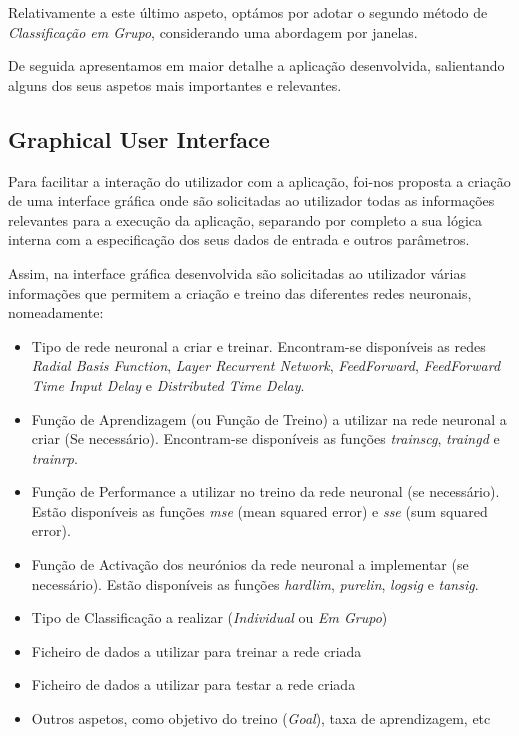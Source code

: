 \documentclass{article}
\begin{document}
Relativamente a este último aspeto, optámos por adotar o segundo método de \emph{Classificação em Grupo}, considerando uma abordagem por janelas.

De seguida apresentamos em maior detalhe a aplicação desenvolvida, salientando alguns dos seus aspetos mais importantes e relevantes.

\subsection{Graphical User Interface}

Para facilitar a interação do utilizador com a aplicação, foi-nos proposta a criação de uma interface gráfica onde são solicitadas ao utilizador todas as informações relevantes para a execução da aplicação, separando por completo a sua lógica interna com a especificação dos seus dados de entrada e outros parâmetros.

Assim, na interface gráfica desenvolvida são solicitadas ao utilizador várias informações que permitem a criação e treino das diferentes redes neuronais, nomeadamente:

\begin{itemize}
\item Tipo de rede neuronal a criar e treinar. Encontram-se disponíveis as redes \emph{Radial Basis Function}, \emph{Layer Recurrent Network}, \emph{FeedForward}, \emph{FeedForward Time Input Delay} e \emph{Distributed Time Delay}.

\item Função de Aprendizagem (ou Função de Treino) a utilizar na rede neuronal a criar (Se necessário). Encontram-se disponíveis as funções \emph{trainscg}, \emph{traingd} e \emph{trainrp}.

\item Função de Performance a utilizar no treino da rede neuronal (se necessário). Estão disponíveis as funções \emph{mse} (mean squared error) e \emph{sse} (sum squared error).

\item Função de Activação dos neurónios da rede neuronal a implementar (se necessário). Estão disponíveis as funções \emph{hardlim}, \emph{purelin}, \emph{logsig} e \emph{tansig}.

\item Tipo de Classificação a realizar (\emph{Individual} ou \emph{Em Grupo})

\item Ficheiro de dados a utilizar para treinar a rede criada

\item Ficheiro de dados a utilizar para testar a rede criada

\item Outros aspetos, como objetivo do treino (\emph{Goal}), taxa de aprendizagem, etc
\end{itemize}
\end{document}

